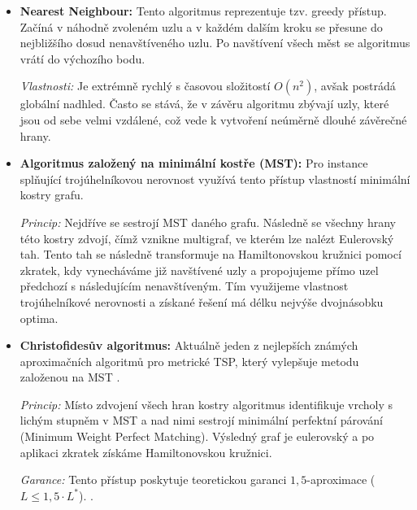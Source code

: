 \begin{itemize}
    \item \textbf{Nearest Neighbour:} 
    Tento algoritmus reprezentuje tzv. greedy přístup. Začíná v náhodně zvoleném uzlu a v každém dalším kroku se přesune do nejbližšího dosud nenavštíveného uzlu. Po navštívení všech měst se algoritmus vrátí do výchozího bodu. 
    
    \textit{Vlastnosti:} Je extrémně rychlý s časovou složitostí $O(n^2)$, avšak postrádá globální nadhled. Často se stává, že v závěru algoritmu zbývají uzly, které jsou od sebe velmi vzdálené, což vede k vytvoření neúměrně dlouhé závěrečné hrany.
    
    \item \textbf{Algoritmus založený na minimální kostře (MST):} 
    Pro instance splňující trojúhelníkovou nerovnost využívá tento přístup vlastností minimální kostry grafu. 
    
    \textit{Princip:} Nejdříve se sestrojí MST daného grafu. Následně se všechny hrany této kostry zdvojí, čímž vznikne multigraf, ve kterém lze nalézt Eulerovský tah. Tento tah se následně transformuje na Hamiltonovskou kružnici pomocí zkratek, kdy vynecháváme již navštívené uzly a propojujeme přímo uzel předchozí s následujícím nenavštíveným. Tím využijeme vlastnost trojúhelníkové nerovnosti a získané řešení má délku nejvýše dvojnásobku optima.

    \item \textbf{Christofidesův algoritmus:} 
    Aktuálně jeden z nejlepších známých aproximačních algoritmů pro metrické TSP, který vylepšuje metodu založenou na MST \cite{ti_sawa}.
    
    \textit{Princip:} Místo zdvojení všech hran kostry algoritmus identifikuje vrcholy s lichým stupněm v MST a nad nimi sestrojí minimální perfektní párování (Minimum Weight Perfect Matching). Výsledný graf je eulerovský a po aplikaci zkratek získáme Hamiltonovskou kružnici.
    
    \textit{Garance:} Tento přístup poskytuje teoretickou garanci $1,5$-aproximace ($L \leq 1,5 \cdot L^*$). \cite{ti_jancar, ti_sawa}.
\end{itemize}




